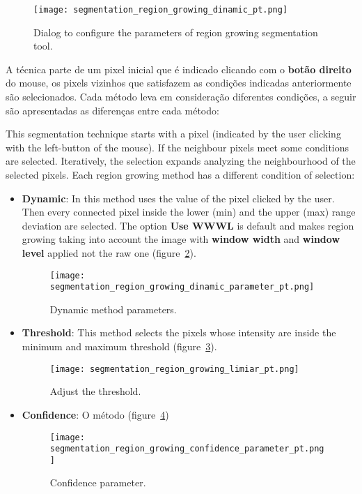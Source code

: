 \begin{figure}[!htb]
    \centering
    \texttt{[image: segmentation\_region\_growing\_dinamic\_pt.png]}
    \caption{Dialog to configure the parameters of region growing segmentation tool.}
    \label{fig:segmentation_region_growing_dinamic}
\end{figure}

A técnica parte de um pixel inicial que é indicado clicando com o \textbf{botão direito} do mouse, os pixels vizinhos que satisfazem as condições indicadas anteriormente são selecionados. Cada método leva em consideração diferentes condições, a seguir são apresentadas as diferenças entre cada método:

This segmentation technique starts with a pixel (indicated by the user clicking with the left-button of the mouse). If the neighbour pixels meet some conditions are selected. Iteratively, the selection expands analyzing the neighbourhood of the selected pixels. Each region growing method has a different condition of selection:

\begin{itemize}
	\item \textbf{Dynamic}: In this method uses the value of the pixel clicked by the user. Then every connected pixel inside the lower (min) and the upper (max) range deviation are selected. The option \textbf{Use WWWL} is default and makes region growing taking into account the image with \textbf{window width} and \textbf{window level} applied not the raw one (figure~\ref{fig:segmentation_region_growing_dinamic_parameter}).

	\begin{figure}[!htb]
	\centering
	\texttt{[image: segmentation\_region\_growing\_dinamic\_parameter\_pt.png]}
	\caption{Dynamic method parameters.}
	\label{fig:segmentation_region_growing_dinamic_parameter}
	\end{figure}

	\item \textbf{Threshold}: This method selects the pixels whose intensity are inside the minimum and maximum threshold (figure~\ref{fig:segmentation_region_growing_limiar}).

	\begin{figure}[!htb]
	\centering
	\texttt{[image: segmentation\_region\_growing\_limiar\_pt.png]}
    \caption{Adjust the threshold.}
	\label{fig:segmentation_region_growing_limiar}
	\end{figure}

	\item \textbf{Confidence}: O método (figure~\ref{fig:segmentation_region_growing_confidence_parameter})

	\begin{figure}[!htb]
	\centering
	\texttt{[image: segmentation\_region\_growing\_confidence\_parameter\_pt.png]}
    \caption{Confidence parameter.}
	\label{fig:segmentation_region_growing_confidence_parameter}
	\end{figure}


\end{itemize}
